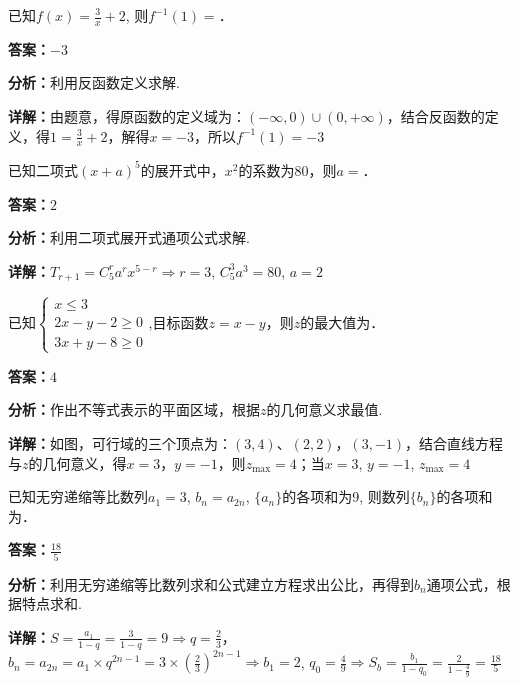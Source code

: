 \begin{question}[points=4]
已知$f(x)=\frac{3}{x}+2$, 则$f^{-1}(1)=$．
\fillin[{$-3$}]
\begin{solution}
\textbf{答案：}$-3$

\textbf{分析：}利用反函数定义求解.

\textbf{详解：}由题意，得原函数的定义域为：$(-\infty,0)\cup(0,+\infty)$，结合反函数的定义，得$1=\frac{3}{x}+2$，解得$x=-3$，所以$f^{-1}(1)=-3$
\end{solution}
\end{question}

\begin{question}[points=4]
已知二项式$(x+a)^5$的展开式中，$x^2$的系数为80，则$a=$．
\fillin[{$2$}]
\begin{solution}
\textbf{答案：}$2$

\textbf{分析：}利用二项式展开式通项公式求解.

\textbf{详解：}$T_{r+1}=C_5^r a^r x^{5-r}\Rightarrow r=3$, $C_5^3a^3=80$, $a=2$
\end{solution}
\end{question}

\begin{question}[points=5]
已知$\begin{cases}x\le 3\\2x-y-2\ge 0\\3x+y-8\ge 0\end{cases}$,目标函数$z=x-y$，则$z$的最大值为．
\fillin[{$4$}]
\begin{solution}
\textbf{答案：}$4$

\textbf{分析：}作出不等式表示的平面区域，根据$z$的几何意义求最值.

\textbf{详解：}如图，可行域的三个顶点为：$(3,4)$、$(2,2)$，$(3,-1)$，结合直线方程与$z$的几何意义，得$x=3$，$y=-1$，则$z_{\max}=4$；当$x=3$, $y=-1$, $z_{\max}=4$
\end{solution}
\end{question}

\begin{question}[points=5]
已知无穷递缩等比数列$a_1=3$, $b_n=a_{2n}$, $\{a_n\}$的各项和为9, 则数列$\{b_n\}$的各项和为．
\fillin[{$\frac{18}{5}$}]
\begin{solution}
\textbf{答案：}$\frac{18}{5}$

\textbf{分析：}利用无穷递缩等比数列求和公式建立方程求出公比，再得到$b_n$通项公式，根据特点求和.

\textbf{详解：}$S=\frac{a_1}{1-q}=\frac{3}{1-q}=9\Rightarrow q=\frac{2}{3}$，$b_n=a_{2n}=a_1\times q^{2n-1}=3\times (\frac{2}{3})^{2n-1}\Rightarrow b_1=2$, $q_0=\frac{4}{9}\Rightarrow S_b=\frac{b_1}{1-q_0}=\frac{2}{1-\frac{4}{9}}=\frac{18}{5}$
\end{solution}
\end{question}

